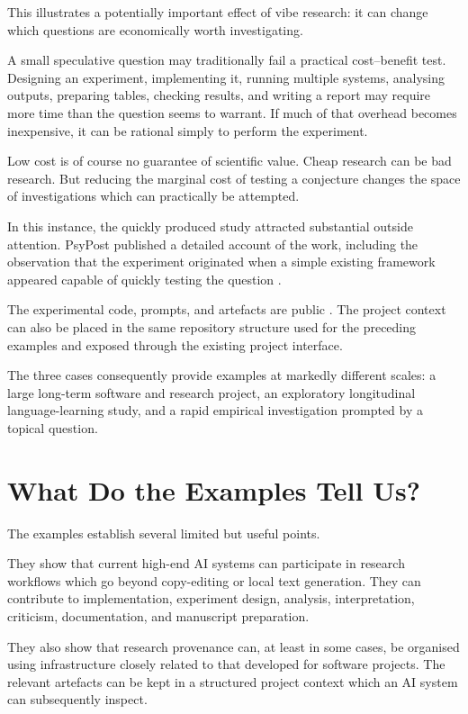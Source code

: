 This illustrates a potentially important effect of vibe research: it can change which questions are economically worth investigating.

A small speculative question may traditionally fail a practical cost--benefit test. Designing an experiment, implementing it, running multiple systems, analysing outputs, preparing tables, checking results, and writing a report may require more time than the question seems to warrant. If much of that overhead becomes inexpensive, it can be rational simply to perform the experiment.

Low cost is of course no guarantee of scientific value. Cheap research can be bad research. But reducing the marginal cost of testing a conjecture changes the space of investigations which can practically be attempted.

In this instance, the quickly produced study attracted substantial outside attention. PsyPost published a detailed account of the work, including the observation that the experiment originated when a simple existing framework appeared capable of quickly testing the question \citep{dolan2025grok}.

The experimental code, prompts, and artefacts are public \citep{raynerChatGPT2025grok}. The project context can also be placed in the same repository structure used for the preceding examples and exposed through the existing project interface.

The three cases consequently provide examples at markedly different scales: a large long-term software and research project, an exploratory longitudinal language-learning study, and a rapid empirical investigation prompted by a topical question.


\section{What Do the Examples Tell Us?}

The examples establish several limited but useful points.

They show that current high-end AI systems can participate in research workflows which go beyond copy-editing or local text generation. They can contribute to implementation, experiment design, analysis, interpretation, criticism, documentation, and manuscript preparation.

They also show that research provenance can, at least in some cases, be organised using infrastructure closely related to that developed for software projects. The relevant artefacts can be kept in a structured project context which an AI system can subsequently inspect.

